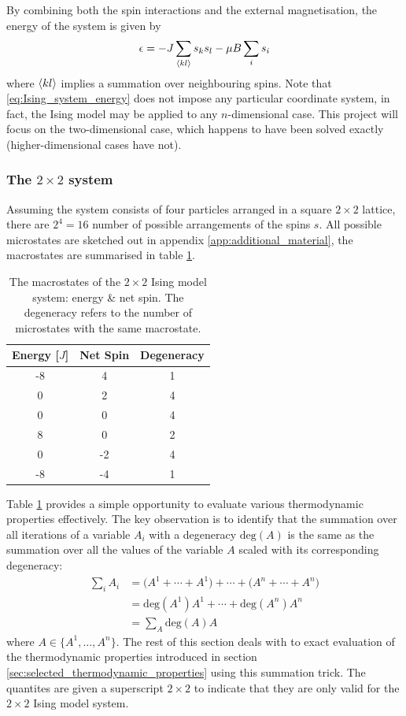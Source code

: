 \documentclass[nofootinbib,reprint,english]{revtex4-1}
\begin{document}
By combining both the spin interactions and the external magnetisation, the energy of the system is given by
\begin{equation}\label{eq:Ising_system_energy}
\epsilon=-J\sum_{\expval{kl}}s_ks_l-\mu B\sum_is_i
\end{equation}
where \(\expval{kl}\) implies a summation over neighbouring spins. Note that \eqref{eq:Ising_system_energy} does not impose any particular coordinate system, in fact, the Ising model may be applied to any \(n\)-dimensional case. This project will focus on the two-dimensional case, which happens to have been solved exactly (higher-dimensional cases have not). 
\subsubsection{The \(2\times2\) system}\label{sec:2by2_system}
Assuming the system consists of four particles arranged in a square \(2\times2\) lattice, there are \(2^4=16\) number of possible arrangements of the spins \(s\). All possible microstates are sketched out in appendix \ref{app:additional_material}, the macrostates are summarised in table \ref{tab:2by2_macrostates}.
\begin{table}
\begin{tabular}{|c|c|c|}
\hline
Energy [\(J\)] & Net Spin & Degeneracy \\\hline
-8 &  4 & 1 \\\hline
0  &  2 & 4 \\\hline
0  &  0 & 4 \\\hline
8  &  0 & 2 \\\hline
0  & -2 & 4 \\\hline
-8 & -4 & 1 \\\hline
\end{tabular}
\caption{The macrostates of the \(2\times2\) Ising model system: energy \& net spin. The degeneracy refers to the number of microstates with the same macrostate.}\label{tab:2by2_macrostates}
\end{table}

Table \ref{tab:2by2_macrostates} provides a simple opportunity to evaluate various thermodynamic properties effectively. The key observation is to identify that the summation over all iterations of a variable \(A_i\) with a degeneracy \(\text{deg}(A)\) is the same as the summation over all the values of the variable \(A\) scaled with its corresponding degeneracy:
\begin{align*}
\sum_iA_i&=\big(A^1+\cdots+A^1\big)+\cdots+\big(A^n+\cdots+A^n\big)\\
&=\text{deg}(A^1)A^1+\cdots+\text{deg}(A^n)A^n\\
&=\sum_A\text{deg}(A)A
\end{align*}
where \(A\in\{A^1,\ldots,A^n\}\). The rest of this section deals with to exact evaluation of the thermodynamic properties introduced in section \ref{sec:selected_thermodynamic_properties} using this summation trick. The quantites are given a superscript \(2\times2\) to indicate that they are only valid for the \(2\times2\) Ising model system.
\end{document}
